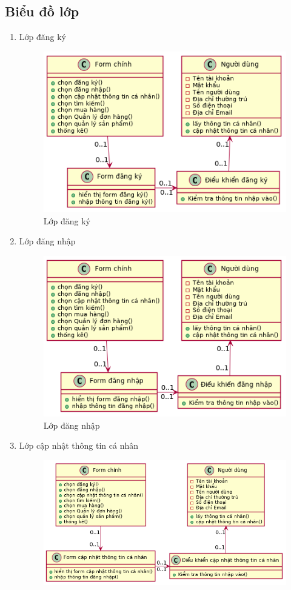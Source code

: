 \subsection{Biểu đồ lớp}
\begin{enumerate}[label=\textbf{\alph*)}]
	\item Lớp đăng ký
	      \begin{figure}[h!]
		      \centering
		      \includegraphics[scale=0.7]{fig/class_dangky.png}
		      \caption{Lớp đăng ký}
	      \end{figure}
	\item Lớp đăng nhập
	      \begin{figure}[h!]
		      \centering
		      \includegraphics[scale=0.7]{fig/class_dangnhap.png}
		      \caption{Lớp đăng nhập}
	      \end{figure}
          \newpage
	\item Lớp cập nhật thông tin cá nhân
	      \begin{figure}[h!]
		      \centering
		      \includegraphics[scale=0.7]{fig/class_update_info.png}

\end{figure}
\end{enumerate}
